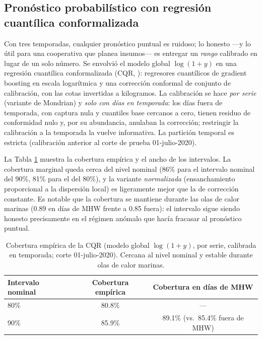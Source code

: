 \documentclass[twoside,11pt]{article}
\begin{document}
\subsection{Pronóstico probabilístico con regresión cuantílica conformalizada}
Con tres temporadas, cualquier pronóstico puntual es ruidoso; lo honesto ---y lo útil para una cooperativa que planea insumos--- es entregar un \emph{rango} calibrado en lugar de un solo número. Se envolvió el modelo global $\log(1+y)$ en una regresión cuantílica conformalizada (CQR, \citealp{romano2019}): regresores cuantílicos de gradient boosting en escala logarítmica y una corrección conformal de conjunto de calibración, con las cotas invertidas a kilogramos. La calibración se hace \emph{por serie} (variante de Mondrian) y \emph{solo con días en temporada}: los días fuera de temporada, con captura nula y cuantiles base cercanos a cero, tienen residuo de conformidad nulo y, por su abundancia, anulaban la corrección; restringir la calibración a la temporada la vuelve informativa. La partición temporal es estricta (calibración anterior al corte de prueba 01-julio-2020).

La Tabla \ref{tab:extension_cqr} muestra la cobertura empírica y el ancho de los intervalos. La cobertura marginal queda cerca del nivel nominal (86\% para el intervalo nominal del 90\%, 81\% para el del 80\%), y la variante \emph{normalizada} (ensanchamiento proporcional a la dispersión local) es ligeramente mejor que la de corrección constante. Es notable que la cobertura se mantiene durante las olas de calor marinas (0.89 en días de MHW frente a 0.85 fuera): el intervalo sigue siendo honesto precisamente en el régimen anómalo que hacía fracasar al pronóstico puntual.

\begin{table}[htbp]
\centering
\begin{tabular}{lcc}
\toprule
Intervalo nominal & Cobertura empírica & Cobertura en días de MHW \\
\midrule
80\% & 80.8\% & --- \\
90\% & 85.9\% & 89.1\% (vs.\ 85.4\% fuera de MHW) \\
\bottomrule
\end{tabular}
\caption{Cobertura empírica de la CQR (modelo global $\log(1+y)$, por serie, calibrada en temporada; corte 01-julio-2020). Cercana al nivel nominal y estable durante olas de calor marinas.}
\label{tab:extension_cqr}
\end{table}
\end{document}
